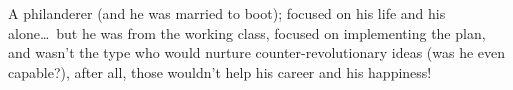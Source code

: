 \documentclass{article}
\begin{document}
A philanderer (and he was married to boot); focused on his life and his alone\ldots~but he was from the working class, focused on implementing the plan, and wasn't the type who would nurture counter-revolutionary ideas (was he even capable?), after all, those wouldn't help his career and his happiness!

%
\end{document}
